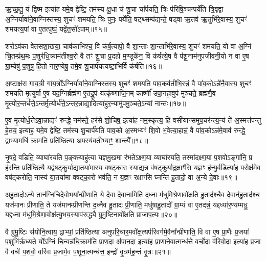 ऋ॒च्छ॒तु॒ यं द्वि॒ष्म इत्या॑ह॒ यमे॒व द्वेष्टि॒ तम॑स्य क्षु॒धा च॑ शु॒चा चा᳚र्पयति॒ त्रिः प॑रिषि॒ञ्चन्पर्ये॑ति त्रि॒वृद्वा अ॒ग्निर्यावा॑ने॒वाग्निस्तस्य॒ शुचꣳ॑ शमयति॒ त्रिः पुनः॒ पर्ये॑ति॒ षट्थ्सम्प॑द्यन्ते॒ षड्वा ऋ॒तव॑ ऋ॒तुभि॑रे॒वास्य॒ शुचꣳ॑ शमयत्य॒पां वा ए॒तत्पुष्पं॒ यद्वे॑त॒सो॑\-ऽपाम्॥१५॥

शरो\-ऽव॑का वेतसशा॒खया॒ चाव॑काभिश्च॒ वि क॑र्\mbox{}ष॒त्यापो॒ वै शा॒न्ताः शा॒न्ताभि॑रे॒वास्य॒ शुचꣳ॑ शमयति॒ यो वा अ॒ग्निं चि॒तम्प्र॑थ॒मः प॒शुर॑धि॒क्राम॑तीश्व॒रो वै तꣳ शु॒चा प्र॒दहो म॒ण्डूके॑न॒ वि क॑र्\mbox{}षत्ये॒ष वै प॑शू॒नाम॑नुपजीवनी॒यो न वा ए॒ष ग्रा॒म्येषु॑ प॒शुषु॑ हि॒तो नार॒ण्येषु॒ तमे॒व शु॒चार्प॑यत्यष्टा॒भिर्वि क॑र्\mbox{}षति॥१६॥

अ॒ष्टाक्ष॑रा गाय॒त्री गा॑य॒त्रो᳚\-ऽग्निर्यावा॑ने॒वाग्निस्तस्य॒ शुचꣳ॑ शमयति पाव॒कव॑तीभि॒रन्नं॒ वै पा॑व॒को\-ऽन्ने॑नै॒वास्य॒ शुचꣳ॑ शमयति मृ॒त्युर्वा ए॒ष यद॒ग्निर्ब्रह्म॑ण ए॒तद्रू॒पं यत्कृ॑ष्णाजि॒नम् कार्\mbox{}ष्णी॑ उपा॒नहा॒वुप॑ मुञ्चते॒ ब्रह्म॑णै॒व मृ॒त्योर॒न्तर्ध॑त्ते॒\-ऽन्तर्मृ॒त्योर्ध॑त्ते॒\-ऽन्तर॒न्नाद्या॒दित्या॑हुर॒न्यामु॑पमु॒ञ्चते॒\-ऽन्यां नान्तः॥१७॥

ए॒व मृ॒त्योर्ध॒त्ते\-ऽवा॒न्नाद्यꣳ॑ रुन्द्धे॒ नम॑स्ते॒ हर॑से शो॒चिष॒ इत्या॑ह नम॒स्कृत्य॒ हि वसी॑याꣳसमुप॒चर॑न्त्य॒न्यं ते॑ अ॒स्मत्त॑पन्तु हे॒तय॒ इत्या॑ह॒ यमे॒व द्वेष्टि॒ तम॑स्य शु॒चार्प॑यति पाव॒को अ॒स्मभ्यꣳ॑ शि॒वो भ॒वेत्या॒हान्नं॒ वै पा॑व॒को\-ऽन्न॑मे॒वाव॑ रुन्द्धे॒ द्वाभ्या॒मधि॑ क्रामति॒ प्रति॑ष्ठित्या अप॒स्य॑वतीभ्या॒ꣳ॒ शान्त्यै᳚॥१८॥

{\anuvakamend[{शुग्वे॑त॒सो॑\-ऽपाम॑ष्टा॒भिर्विक॑र्\mbox{}षति॒ नान्तरेका॒न्नप॑ञ्चा॒शच्च॑॥४॥}]}

नृ॒षदे॒ वडिति॒ व्याघा॑रयति प॒ङ्क्त्याहु॑त्या यज्ञमु॒खमा र॑भते\-ऽक्ष्ण॒या व्याघा॑रयति॒ तस्मा॑दक्ष्ण॒या प॒शवो\-ऽङ्गा॑नि॒ प्र ह॑रन्ति॒ प्रति॑ष्ठित्यै॒ यद्व॑षट्कु॒र्याद्या॒तया॑मास्य वषट्का॒रः स्या॒द्यन्न व॑षट्कु॒॒र्याद्रक्षाꣳ॑सि य॒ज्ञꣳ ह॑न्यु॒र्वडित्या॑ह प॒रोक्ष॑मे॒व वष॑ट्करोति॒ नास्य॑ या॒तया॑मा वषट्का॒रो भव॑ति॒ न य॒ज्ञꣳ रक्षाꣳ॑सि घ्नन्ति हु॒तादो॒ वा अ॒न्ये दे॒वाः॥१९॥

अ॒हु॒तादो॒\-ऽन्ये तान॑ग्नि॒चिदे॒वोभया᳚न्प्रीणाति॒ ये दे॒वा दे॒वाना॒मिति॑ द॒ध्ना म॑धुमि॒श्रेणावो᳚क्षति हु॒ताद॑श्चै॒व दे॒वान॑हु॒ताद॑श्च॒ यज॑मानः प्रीणाति॒ ते यज॑मानम्प्रीणन्ति द॒ध्नैव हु॒तादः॑ प्री॒णाति॒ मधु॑षाहु॒तादो᳚ ग्रा॒म्यं वा ए॒तदन्नं॒ यद्दध्या॑र॒ण्यम्मधु॒ यद्द॒ध्ना म॑धुमि॒श्रेणा॒वोक्ष॑त्यु॒भय॒स्याव॑रुद्ध्यै ग्रुमु॒ष्टिनावो᳚क्षति प्राजाप॒त्यः॥२०॥

वै ग्रु॑मु॒ष्टिः स॑योनि॒त्वाय॒ द्वाभ्यां॒ प्रति॑ष्ठित्या अनुपरि॒चार॒मवो᳚क्ष॒त्यप॑रिवर्गमे॒वैना᳚न्प्रीणाति॒ वि वा ए॒ष प्रा॒णैः प्र॒जया॑ प॒शुभि॑र्\mbox{}ऋध्यते॒ यो᳚\-ऽग्निं चि॒न्वन्न॑धि॒क्राम॑ति प्राण॒दा अ॑पान॒दा इत्या॑ह प्रा॒णाने॒वात्मन्ध॑त्ते वर्चो॒दा व॑रिवो॒दा इत्या॑ह प्र॒जा वै वर्चः॑ प॒शवो॒ वरि॑वः प्र॒जामे॒व प॒शूना॒त्मन्ध॑त्त॒ इन्द्रो॑ वृ॒त्रम॑ह॒न्तं वृ॒त्रः॥२१॥

